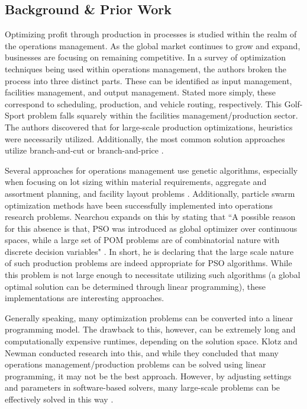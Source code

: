\documentclass{article}
\begin{document}
\subsection{Background \& Prior Work}
Optimizing profit through production in processes is studied within the realm of the operations management.  As the global market continues to grow and expand, businesses are focusing on remaining competitive.  In a survey of 
optimization techniques being used within operations management, the authors broken the process into three distinct parts.  These can be identified as input management, facilities management, and output management.  Stated more simply, these correspond to 
scheduling, production, and vehicle routing, respectively.  This Golf-Sport problem falls squarely within the facilities management/production sector.  The authors discovered that for large-scale production optimizations, heuristics were necessarily utilized.  
Additionally, the most common solution approaches utilize branch-and-cut or branch-and-price \cite{survey}.
\par
Several approaches for operations management use genetic algorithms, especially when focusing on lot sizing within material requirements, aggregate and assortment planning, and facility layout problems \cite{gen}.  
Additionally, particle swarm optimization methods have been successfully implemented into operations research problems.  Nearchou expands on this by stating that ``A possible reason for this absence is that, PSO was introduced as global optimizer over continuous spaces, while a large set of POM problems are of combinatorial nature with discrete decision variables" \cite{and}.  In short, he is declaring that the large scale nature of such production problems are indeed appropriate for PSO algorithms.  
While this problem is not large enough to necessitate utilizing such algorithms (a global optimal solution can be determined through linear programming), these implementations are interesting approaches.
\par
Generally speaking, many optimization problems can be converted into a linear programming model.  The drawback to this, however, can be extremely long and computationally expensive runtimes, depending on the solution space.  Klotz and Newman conducted research into this, and 
while they concluded that many operations management/production problems can be solved using linear programming, it may not be the best approach.  However, by adjusting settings and parameters in software-based solvers, many large-scale problems can be effectively solved in this way \cite{klotz}. 
\end{document}

